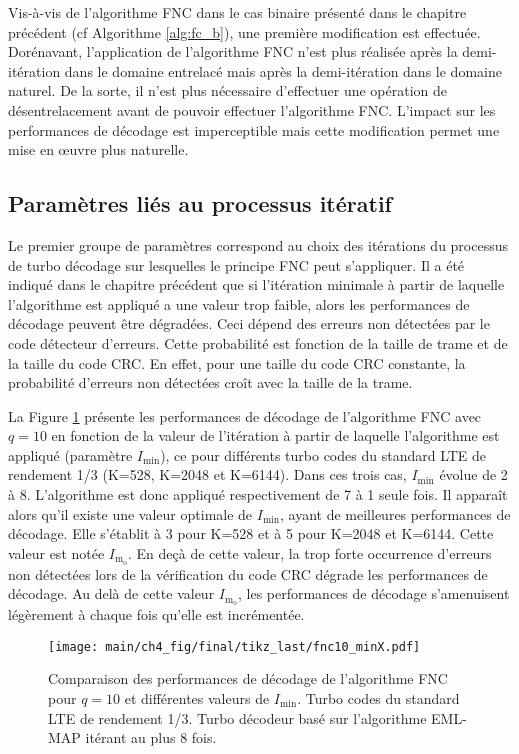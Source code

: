 Vis-à-vis de l'algorithme FNC dans le cas binaire présenté dans le chapitre précédent (cf Algorithme \ref{alg:fc_b}), une première modification est effectuée. 
Dorénavant, l'application de l'algorithme FNC n'est plus réalisée après la demi-itération dans le domaine
entrelacé mais après la demi-itération dans le domaine naturel. De la sorte, il n'est plus nécessaire d'effectuer une 
opération de désentrelacement avant de pouvoir effectuer l'algorithme FNC. L'impact sur les performances de décodage est
imperceptible mais cette modification permet une mise en œuvre plus naturelle.

\subsection{Paramètres liés au processus itératif}
Le premier groupe de paramètres correspond au choix des itérations du processus de turbo décodage sur lesquelles le 
principe FNC peut s'appliquer. Il a été indiqué dans le chapitre précédent que si l'itération minimale à partir de 
laquelle l'algorithme est appliqué a une valeur trop faible, alors les performances de décodage peuvent être dégradées. Ceci dépend 
des erreurs non détectées par le code détecteur d'erreurs. Cette probabilité est fonction de la taille de trame et de la 
taille du code CRC. En effet, pour une taille du code CRC constante, la probabilité d'erreurs non détectées croît avec la
taille de la trame. 

La Figure \ref{fig:fnc_minX} présente les performances de décodage de l'algorithme FNC avec $q=10$ en fonction de la 
valeur de l'itération à partir de laquelle l'algorithme est appliqué (paramètre $I_\text{min}$), ce pour 
différents turbo codes du standard LTE de rendement 1/3 (K=528, K=2048 et K=6144). Dans ces trois cas, $I_\text{min}$ évolue de 2 à 8. L'algorithme est donc 
appliqué respectivement de 7 à 1 seule fois. Il apparaît alors qu'il existe une valeur optimale de 
$I_\text{min}$, ayant de meilleures performances de décodage. Elle s'établit à 3 pour K=528 et à 5 pour 
K=2048 et K=6144. Cette valeur est notée $I_{\text{m}_\text{o}}$. En deçà de cette valeur, la trop forte 
occurrence d'erreurs non détectées lors de la vérification du 
code CRC dégrade les performances de décodage. Au delà de cette valeur $I_{\text{m}_\text{o}}$, les performances de décodage s'amenuisent légèrement à chaque fois qu'elle est incrémentée.

\begin{figure}[!h]
	\centering 
	\hspace*{-.1\textwidth}
	\texttt{[image: main/ch4\_fig/final/tikz\_last/fnc10\_minX.pdf]}
	\caption{Comparaison des performances de décodage de l'algorithme FNC pour $q=10$ et différentes valeurs de 
	$I_\text{min}$. Turbo codes du standard LTE de rendement 1/3. 
	Turbo décodeur basé sur l'algorithme EML-MAP itérant au plus 8 fois.
	\label{fig:fnc_minX}}
\end{figure}


